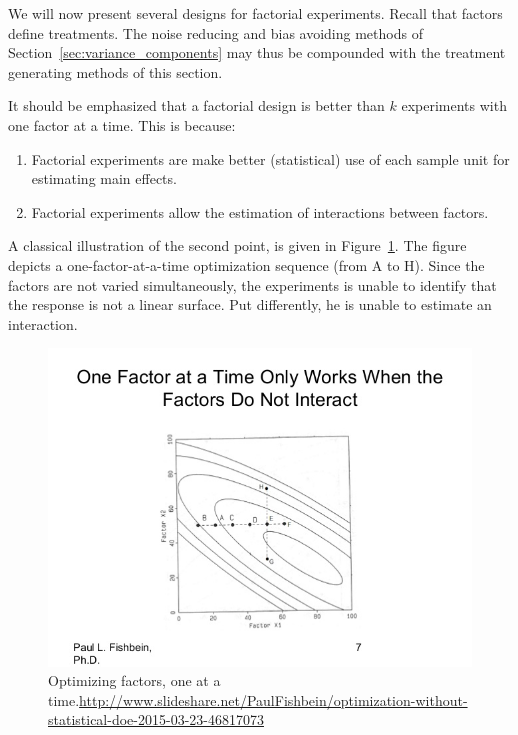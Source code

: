 \documentclass[12pt,a4paper]{report}
\theoremstyle{plain}
\theoremstyle{definition}
\begin{document}
We will now present several designs for factorial experiments.
Recall that factors define treatments. The noise reducing and bias avoiding methods of Section~\ref{sec:variance_components} may thus be compounded with the treatment generating methods of this section.

It should be emphasized that a factorial design is better than $k$ experiments with one factor at a time. This is because:
\begin{enumerate}
\item Factorial experiments are make better (statistical) use of each sample unit for estimating main effects.
\item Factorial experiments allow the estimation of interactions between factors. 
\end{enumerate}
A classical illustration of the second point, is given in Figure~\ref{fig:one_factor_at_a_time}.
The figure depicts a one-factor-at-a-time optimization sequence (from A to H). Since the factors are not varied simultaneously, the experiments is unable to identify that the response is not a linear surface. 
Put differently, he is unable to estimate an interaction.

\begin{figure}[ht]
\centering
\includegraphics[height=0.3\textheight]{art/optimization-without-statistical-doe-2015-03-23-7-638}
\caption[One-at-a-time optimization]{Optimizing factors, one at a time.\newline \url{http://www.slideshare.net/PaulFishbein/optimization-without-statistical-doe-2015-03-23-46817073}}
\label{fig:one_factor_at_a_time}
\end{figure}
\end{document}

